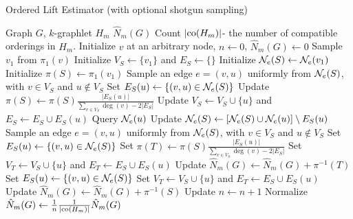 \begin{algorithm}[h]
\label{alg:OLE}
\caption{Ordered Lift Estimator (with optional shotgun sampling)}
\begin{algorithmic}
    \INPUT Graph $G$, $k$-graphlet $H_m$
    \OUTPUT $\hat N_m(G)$
    \STATE Count $|\mathrm{co}(H_m)|$- the number of compatible orderings in $H_m$.
    \STATE Initialize $v$ at an arbitrary node, $n \gets 0$, $\hat N_m(G) \gets 0$
        \STATE Sample $v_1$ from $\pi_1(v)$
        \STATE Initialize $V_S \gets \{v_1\}$ and $E_S \gets \{\}$
        \STATE Initialize $\mathcal{N}_e(S)\gets \mathcal{N}_e(v_1)$
        \STATE Initialize $\pi(S) \gets \pi_1(v_1)$
            \STATE Sample an edge $e=(v,u)$ uniformly from $\mathcal{N}_e(S)$, with $v\in V_S$ and $u\notin V_S$
            \STATE Set $E_S(u) \gets \{(v,u)\in \mathcal{N}_e(S)\}$
            \STATE Update $\pi(S)\gets \pi(S)\frac{|E_S(u)|}{\sum_{v\in V_S} \deg(v) - 2|E_S|}$
            \STATE Update $V_S\gets V_S\cup\{u\}$ and $E_S \gets E_S \cup E_S(u)$
            \STATE Query $\mathcal{N}_e(u)$
            \STATE Update $\mathcal{N}_e(S) \gets [\mathcal{N}_e(S)\cup\mathcal{N}_e(u)]\setminus E_S(u)$
        \ENDWHILE
            \STATE Sample an edge $e=(v,u)$ uniformly from $\mathcal{N}_e(S)$, with $v\in V_S$ and $u\notin V_S$
            \STATE Set $E_S(u) \gets \{(v,u)\in \mathcal{N}_e(S)\}$
            \STATE Set $\pi(T)\gets \pi(S)\frac{|E_S(u)|}{\sum_{v\in V_S} \deg(v) - 2|E_S|}$
            \STATE Set $V_T\gets V_S\cup\{u\}$ and $E_T \gets E_S\cup E_S(u)$
                \STATE Update $\hat N_m(G) \gets \hat N_m(G) + \pi^{-1}(T)$ 
            \ENDIF
        \ENDIF
                \STATE Set $E_S(u) \gets \{(v,u)\in \mathcal{N}_e(S)\}$
                \STATE Set $V_T\gets V_S\cup\{u\}$ and $E_T \gets E_S \cup E_S(u)$
                    \STATE Update $\hat N_m(G) \gets \hat N_m(G) + \pi^{-1}(S)$
                \ENDIF
            \ENDFOR
        \ENDIF
        \STATE Update $n \gets n + 1$
    \ENDWHILE
    \STATE Normalize $\hat N_m(G) \gets \frac{1}{n}\frac{1}{|\mathrm{co}(H_m)|}\hat N_m(G)$
\end{algorithmic}
\end{algorithm}
	

